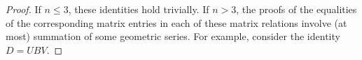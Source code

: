 \documentclass[a4paper,11pt]{amsart}
\begin{document}
\begin{proof}
If $n\leq 3$, these identities hold trivially. If $n>3$, the proofs of the 
equalities of the corresponding matrix entries %
in each of these matrix relations
involve (at most) summation of some geometric series. For example,
consider the identity $D=UBV$.

\end{proof}
\end{document}

